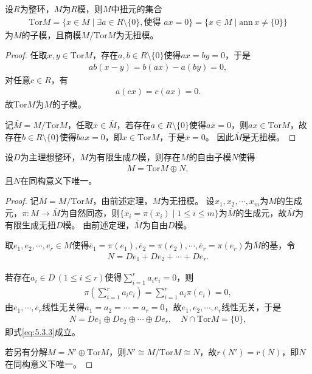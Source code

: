 \documentclass[../../main.tex]{subfiles}%
\begin{document}
\begin{theorem}
设$R$为整环，$M$为$R$模，则$M$中扭元的集合
\begin{align*}
\mathrm{Tor}M=\{x\in M\mid \exists a\in R\setminus\{0\},\text{使得 }ax=0\}=\{x\in M\mid \mathrm{ann}\,x\neq\{0\}\}
\end{align*}
为$M$的子模，且商模$M/\mathrm{Tor}M$为无扭模。
\end{theorem}
\begin{proof}

任取$x,y\in\mathrm{Tor}M$，存在$a,b\in R\setminus\{0\}$使得$ax=by=0$，于是
\begin{align*}
ab(x-y)=b(ax)-a(by)=0,
\end{align*}
对任意$c\in R$，有
\begin{align*}
a(cx)=c(ax)=0.
\end{align*}
故$\mathrm{Tor}M$为$M$的子模。

记$\overline{M}=M/\mathrm{Tor}M$，任取$\overline{x}\in\overline{M}$，若存在$a\in R\setminus\{0\}$使得$a\overline{x}=0$，则$ax\in\mathrm{Tor}M$，故存在$b\in R\setminus\{0\}$使得$bax=0$，即$x\in\mathrm{Tor}M$，于是$\overline{x}=0$。
因此$\overline{M}$是无扭模。

\end{proof}

\begin{theorem}
设$D$为主理想整环，$M$为有限生成$D$模，则存在$M$的自由子模$N$使得
\begin{align}\label{eq:5.3.3}
M=\mathrm{Tor}M\oplus N,
\end{align}
且$N$在同构意义下唯一。
\end{theorem}
\begin{proof}

记$\overline{M}=M/\mathrm{Tor}M$，由前述定理，$\overline{M}$为无扭模。
设$x_1,x_2,\cdots,x_m$为$M$的生成元，$\pi:M\to\overline{M}$为自然同态，则$\{\overline{x}_i=\pi(x_i)\mid 1\leqslant i\leqslant m\}$为$\overline{M}$的生成元，故$\overline{M}$为有限生成无扭$D$模。
由前述定理，$\overline{M}$为自由$D$模。

取$e_1,e_2,\cdots,e_r\in M$使得$\overline{e}_1=\pi(e_1),\overline{e}_2=\pi(e_2),\cdots,\overline{e}_r=\pi(e_r)$为$\overline{M}$的基，令
\begin{align*}
N=De_1+De_2+\cdots+De_r.
\end{align*}

若存在$a_i\in D\,(1\leqslant i\leqslant r)$使得$\sum_{i=1}^{r}a_ie_i=0$，则
\begin{align*}
\pi\left(\sum_{i=1}^{r}a_ie_i\right)=\sum_{i=1}^{r}a_i\pi(e_i)=0,
\end{align*}
由$\overline{e}_1,\cdots,\overline{e}_r$线性无关得$a_1=a_2=\cdots=a_r=0$，故$e_1,e_2,\cdots,e_r$线性无关，于是
\begin{align*}
N=De_1\oplus De_2\oplus\cdots\oplus De_r,\quad N\cap\mathrm{Tor}M=\{0\},
\end{align*}
即式\eqref{eq:5.3.3}成立。

若另有分解$M=N'\oplus\mathrm{Tor}M$，则$N'\cong M/\mathrm{Tor}M\cong N$，故$r(N')=r(N)$，即$N$在同构意义下唯一。

\end{proof}
\end{document}
